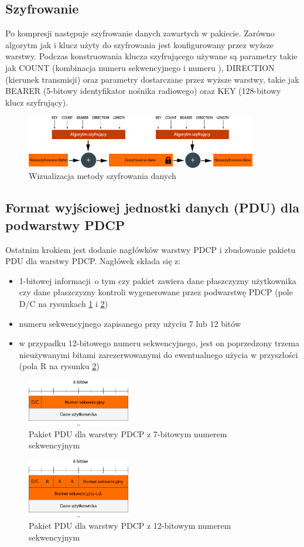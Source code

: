 \subsection{Szyfrowanie}

Po kompresji następuje szyfrowanie danych zawartych w pakiecie. Zarówno algorytm jak i klucz użyty do szyfrowania jest konfigurowany przez wyższe warstwy. Podczas konstruowania klucza szyfrującego używane są parametry takie jak COUNT (kombinacja numeru sekwencyjnego i numeru ), DIRECTION (kierunek transmisji) oraz parametry dostarczane przez wyższe warstwy, takie jak BEARER (5-bitowy identyfikator nośnika radiowego) oraz KEY (128-bitowy klucz szyfrujący).

\begin{figure}[ht]
	\centerline{\includegraphics[width=0.9\textwidth]{images/pdcp-eps.png}}
	\caption{Wizualizacja metody szyfrowania danych}
\end{figure}

\subsection{Format wyjściowej jednostki danych (PDU) dla podwarstwy PDCP}

Ostatnim krokiem jest dodanie nagłówków warstwy PDCP i zbudowanie pakietu PDU dla warstwy PDCP. Nagłówek składa się z:
\begin{itemize}
	\item 1-bitowej informacji o tym czy pakiet zawiera dane płaszczyzny użytkownika czy dane płaszczyzny kontroli wygenerowane przez podwarstwę PDCP (pole D/C na rysunkach \ref{fig:pdcp7bit} i \ref{fig:pdcp12bit})
	\item numeru sekwencyjnego zapisanego przy użyciu 7 lub 12 bitów
	\item w przypadku 12-bitowego numeru sekwencyjnego, jest on poprzedzony trzema nieużywanymi bitami zarezerwowanymi do ewentualnego użycia w przyszłości (pola R na rysunku \ref{fig:pdcp12bit})
\end{itemize}

\begin{figure}[ht]
	\centerline{\includegraphics[width=0.4\textwidth]{images/pdcp-pdu-7bit.png}}
	\caption{Pakiet PDU dla warstwy PDCP z 7-bitowym numerem sekwencyjnym}
	\label{fig:pdcp7bit}
\end{figure}

\begin{figure}[ht]
	\centerline{\includegraphics[width=0.4\textwidth]{images/pdcp-pdu-12bit.png}}
	\caption{Pakiet PDU dla warstwy PDCP z 12-bitowym numerem sekwencyjnym}
	\label{fig:pdcp12bit}
\end{figure}